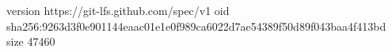 version https://git-lfs.github.com/spec/v1
oid sha256:9263d3f0e901144eaac01e1e0f989ca6022d7ae54389f50d89f043baa4f413bd
size 47460
